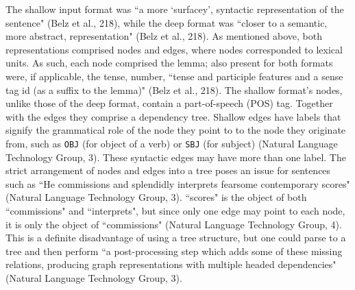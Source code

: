 \documentclass[12pt,letterpaper]{article}
\begin{document}
\begin{flushleft}
  The shallow input format was ``a more `surfacey', syntactic representation of the sentence" (Belz et al., 218), while the deep format was ``closer to a semantic, more abstract, representation" (Belz et al., 218). As mentioned above, both representations comprised nodes and edges, where nodes corresponded to lexical units. As such, each node comprised the lemma; also present for both formats were, if applicable, the tense, number, ``tense and participle features and a sense tag id (as a suffix to the lemma)" (Belz et al., 218). %
  The shallow format's nodes, unlike those of the deep format, contain a part-of-speech (POS) tag. Together with the edges they comprise a dependency tree. Shallow edges have labels that signify the grammatical role of the node they point to to the node they originate from, such as \texttt{OBJ} (for object of a verb) or \texttt{SBJ} (for subject) (Natural Language Technology Group, 3). These syntactic edges may have more than one label. The strict arrangement of nodes and edges into a tree poses an issue for sentences such as ``He commissions and splendidly interprets fearsome contemporary scores" (Natural Language Technology Group, 3). ``scores" is the object of both ``commissions" and ``interprets", but since only one edge may point to each node, it is only the object of ``commissions" (Natural Language Technology Group, 4). This is a definite disadvantage of using a tree structure, but one could parse to a tree and then perform ``a post-processing step which adds some of these missing relations, producing graph representations with multiple headed dependencies" (Natural Language Technology Group, 3).

\end{flushleft}
\end{document}
